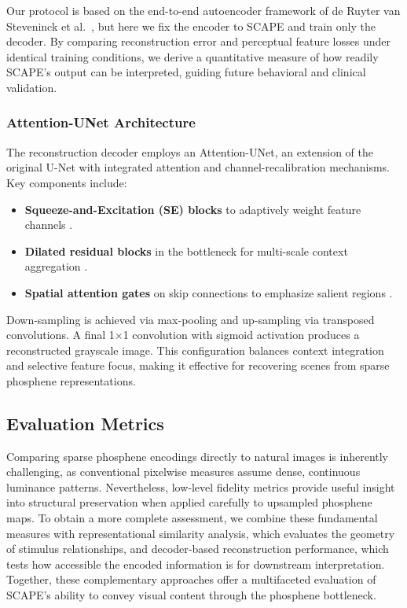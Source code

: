 Our protocol is based on the end-to-end autoencoder framework of de Ruyter van Steveninck et al.\ \cite{deRuytervanSteveninck2020}, but here we fix the encoder to SCAPE and train only the decoder. By comparing reconstruction error and perceptual feature losses under identical training conditions, we derive a quantitative measure of how readily SCAPE’s output can be interpreted, guiding future behavioral and clinical validation.  


\subsubsection{Attention-UNet Architecture}
The reconstruction decoder employs an Attention-UNet, an extension of the original U-Net \cite{Ronneberger2015} with integrated attention and channel-recalibration mechanisms. Key components include:

\begin{itemize}
  \item \textbf{Squeeze-and-Excitation (SE) blocks} to adaptively weight feature channels \cite{Hu2018}.
  \item \textbf{Dilated residual blocks} in the bottleneck for multi-scale context aggregation \cite{Yu2016}.
  \item \textbf{Spatial attention gates} on skip connections to emphasize salient regions \cite{Oktay2018}.
\end{itemize}

Down-sampling is achieved via max-pooling and up-sampling via transposed convolutions. A final 1×1 convolution with sigmoid activation produces a reconstructed grayscale image. This configuration balances context integration and selective feature focus, making it effective for recovering scenes from sparse phosphene representations.  



\subsection{Evaluation Metrics}
Comparing sparse phosphene encodings directly to natural images is inherently challenging, as conventional pixelwise measures assume dense, continuous luminance patterns. Nevertheless, low‐level fidelity metrics provide useful insight into structural preservation when applied carefully to upsampled phosphene maps. To obtain a more complete assessment, we combine these fundamental measures with representational similarity analysis, which evaluates the geometry of stimulus relationships, and decoder‐based reconstruction performance, which tests how accessible the encoded information is for downstream interpretation. Together, these complementary approaches offer a multifaceted evaluation of SCAPE’s ability to convey visual content through the phosphene bottleneck.

